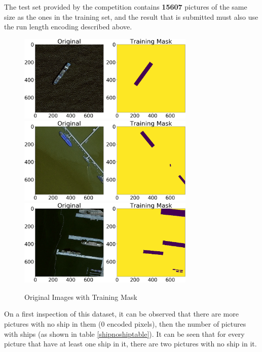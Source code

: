The test set provided by the competition contains \textbf{15607} pictures of the same size as the ones in the training set, and the result that is submitted must also use the run length encoding described above.
\begin{figure}
	\centering
	\includegraphics[width=0.75\textwidth]{Pictures/015OrigMaskExample1.png} \\
	\includegraphics[width=0.75\textwidth]{Pictures/015OrigMaskExample2.png} \\
	\includegraphics[width=0.75\textwidth]{Pictures/015OrigMaskExample3.png} 
	\caption{Original Images with Training Mask}
	\label{OrigMask}
\end{figure}

On a first inspection of this dataset, it can be observed that there are more pictures with no ship in them (0 encoded pixels), then the number of pictures with ships (as shown in table \ref{shipnoshiptable}). It can be seen that for every picture that have at least one ship in it, there are two pictures with no ship in it.

